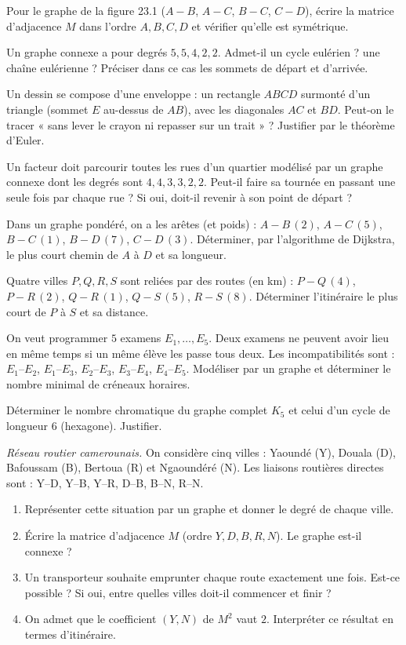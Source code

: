 \exo{} Pour le graphe de la figure 23.1 ($A\!-\!B$, $A\!-\!C$, $B\!-\!C$, $C\!-\!D$),
écrire la matrice d'adjacence $M$ dans l'ordre $A,B,C,D$ et vérifier qu'elle est symétrique.

\exo{} Un graphe connexe a pour degrés $5,5,4,2,2$. Admet-il un cycle eulérien ?
une chaîne eulérienne ? Préciser dans ce cas les sommets de départ et d'arrivée.

\exo{} Un dessin se compose d'une enveloppe : un rectangle $ABCD$ surmonté d'un
triangle (sommet $E$ au-dessus de $AB$), avec les diagonales $AC$ et $BD$. Peut-on le tracer
« sans lever le crayon ni repasser sur un trait » ? Justifier par le théorème d'Euler.

\exo{} Un facteur doit parcourir toutes les rues d'un quartier modélisé par un graphe
connexe dont les degrés sont $4,4,3,3,2,2$. Peut-il faire sa tournée en passant une seule fois
par chaque rue ? Si oui, doit-il revenir à son point de départ ?

\exo{} Dans un graphe pondéré, on a les arêtes (et poids) : $A\!-\!B\,(2)$,
$A\!-\!C\,(5)$, $B\!-\!C\,(1)$, $B\!-\!D\,(7)$, $C\!-\!D\,(3)$. Déterminer, par l'algorithme
de Dijkstra, le plus court chemin de $A$ à $D$ et sa longueur.

\exo{} Quatre villes $P,Q,R,S$ sont reliées par des routes (en km) :
$P\!-\!Q\,(4)$, $P\!-\!R\,(2)$, $Q\!-\!R\,(1)$, $Q\!-\!S\,(5)$, $R\!-\!S\,(8)$. Déterminer
l'itinéraire le plus court de $P$ à $S$ et sa distance.

\exo{} On veut programmer $5$ examens $E_1,\dots,E_5$. Deux examens ne peuvent avoir
lieu en même temps si un même élève les passe tous deux. Les incompatibilités sont :
$E_1$–$E_2$, $E_1$–$E_3$, $E_2$–$E_3$, $E_3$–$E_4$, $E_4$–$E_5$. Modéliser par un graphe et
déterminer le nombre minimal de créneaux horaires.

\exo{} Déterminer le nombre chromatique du graphe complet $K_5$ et celui d'un cycle
de longueur $6$ (hexagone). Justifier.

\exo{} \emph{Réseau routier camerounais.} On considère cinq villes :
Yaoundé (Y), Douala (D), Bafoussam (B), Bertoua (R) et Ngaoundéré (N). Les liaisons
routières directes sont : Y–D, Y–B, Y–R, D–B, B–N, R–N.
\begin{enumerate}[label=\arabic*)]
\item Représenter cette situation par un graphe et donner le degré de chaque ville.
\item Écrire la matrice d'adjacence $M$ (ordre $Y,D,B,R,N$). Le graphe est-il connexe ?
\item Un transporteur souhaite emprunter chaque route exactement une fois. Est-ce possible ?
Si oui, entre quelles villes doit-il commencer et finir ?
\item On admet que le coefficient $(Y,N)$ de $M^2$ vaut $2$. Interpréter ce résultat
en termes d'itinéraire.
\end{enumerate}

